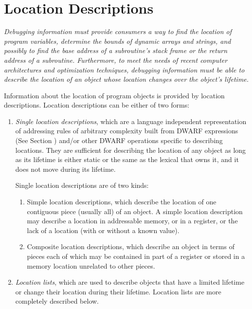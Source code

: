 \section{Location Descriptions}
\label{chap:locationdescriptions}
\textit{Debugging information 
must 
provide consumers a way to find
the location of program variables, determine the bounds
of dynamic arrays and strings, and possibly to find the
base address of a subroutine’s stack frame or the return
address of a subroutine. Furthermore, to meet the needs of
recent computer architectures and optimization techniques,
debugging information must be able to describe the location of
an object whose location changes over the object’s lifetime.}

Information about the location of program objects is provided
by location descriptions. Location descriptions can be either
of two forms:
\begin{enumerate}[1]
\item \textit{Single location descriptions}, 
which 
are a language independent representation of
addressing rules of arbitrary complexity built from 
DWARF expressions (See Section ) 
and/or other
DWARF operations specific to describing locations. They are
sufficient for describing the location of any object as long
as its lifetime is either static or the same as the lexical
 that owns it, 
and it does not move during its lifetime.

Single location descriptions are of two kinds:
\begin{enumerate}[a]
\item Simple location descriptions, which describe the location
of one contiguous piece (usually all) of an object. A simple
location description may describe a location in addressable
memory, or in a register, or the lack of a location (with or
without a known value).

\item  Composite location descriptions, which describe an
object in terms of pieces each of which may be contained in
part of a register or stored in a memory location unrelated
to other pieces.

\end{enumerate}
\item \textit{Location lists}, which are used to 
describe
objects that have a limited lifetime or change their location
during their lifetime. Location lists are more completely
described below.

\end{enumerate}

